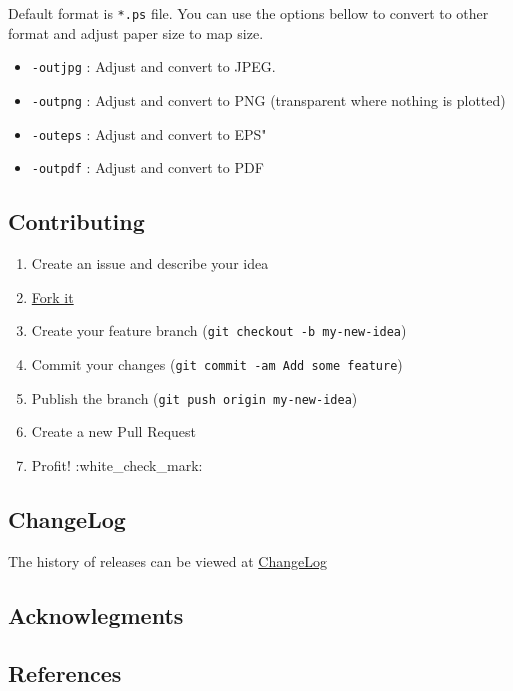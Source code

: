 Default format is \texttt{*.ps} file. You can use the options bellow to
convert to other format and adjust paper size to map size.

\begin{itemize}
\item
  \texttt{-outjpg} : Adjust and convert to JPEG.
\item
  \texttt{-outpng} : Adjust and convert to PNG (transparent where
  nothing is plotted)
\item
  \texttt{-outeps} : Adjust and convert to EPS"
\item
  \texttt{-outpdf} : Adjust and convert to PDF
\end{itemize}

\subsection{Contributing}\label{contributing}

\begin{enumerate}
\def\labelenumi{\arabic{enumi}.}

\item
  Create an issue and describe your idea
\item
  \href{https://github.com/demanasta/coulomb2gmt/network\#fork-destination-box}{Fork
  it}
\item
  Create your feature branch (\texttt{git\ checkout\ -b\ my-new-idea})
\item
  Commit your changes
  (\texttt{git\ commit\ -am\ Add\ some\ feature})
\item
  Publish the branch (\texttt{git\ push\ origin\ my-new-idea})
\item
  Create a new Pull Request
\item
  Profit! :white\_check\_mark:
\end{enumerate}

\subsection{ChangeLog}\label{changelog}

The history of releases can be viewed at
\href{docs/ChangeLog.md}{ChangeLog}

\subsection{Acknowlegments}\label{acknowlegments}

\subsection{References}\label{references}


